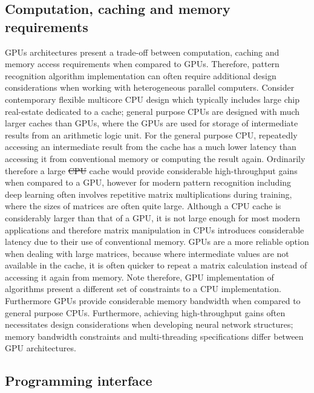 \documentclass[10pt]{article}[draft]
\begin{document}
\subsection{Computation, caching and memory requirements}
GPUs architectures present a trade-off between computation, caching and memory access requirements when compared to GPUs. Therefore, pattern recognition algorithm implementation can often require additional design considerations when working with heterogeneous parallel computers. Consider contemporary flexible multicore CPU design which typically includes  large chip real-estate dedicated to a cache; general purpose CPUs are designed with much larger caches than GPUs, where the GPUs are used for storage of intermediate results from an arithmetic logic unit. For the general purpose CPU, repeatedly accessing an intermediate result from the cache has a much lower latency than accessing it from conventional memory or computing the result again. Ordinarily therefore a large \st{CPU} cache would provide considerable high-throughput gains when compared to a GPU, however for modern pattern recognition including deep learning often involves repetitive matrix multiplications during training, where the sizes of  matrices are often quite large. Although a CPU cache is considerably larger than that of a GPU, it is not large enough for most modern applications and therefore matrix manipulation in CPUs introduces considerable latency due to their use of conventional memory. GPUs are a more reliable option when dealing with large matrices,  because where intermediate values are not available in the cache, it is  often quicker to repeat  a matrix calculation instead of accessing it again from memory. Note therefore, GPU implementation of algorithms present a different set of constraints to a CPU implementation.  Furthermore GPUs provide considerable memory bandwidth when compared to general purpose CPUs. Furthermore, achieving high-throughput gains often necessitates design considerations when developing  neural network structures;  memory bandwidth constraints and multi-threading specifications differ between GPU architectures.

\subsection{Programming interface}
\end{document}
